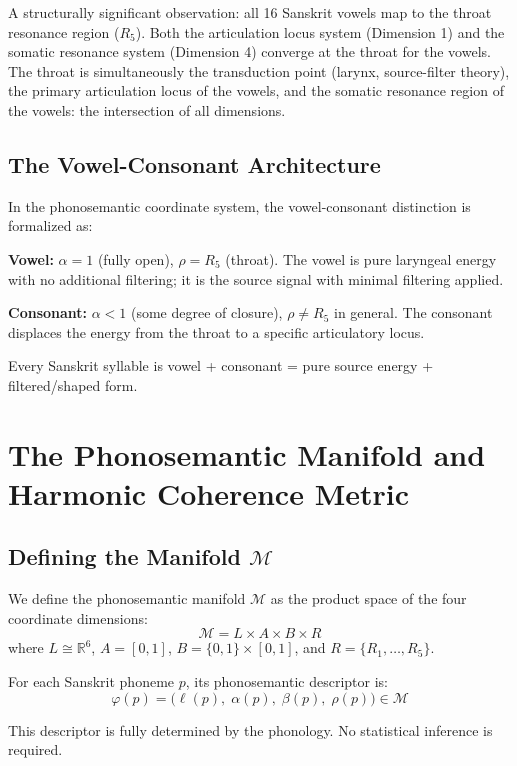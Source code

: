 \documentclass[12pt]{article}
\begin{document}
A structurally significant observation: all 16 Sanskrit vowels map to the throat resonance region ($R_5$). Both the articulation locus system (Dimension 1) and the somatic resonance system (Dimension 4) converge at the throat for the vowels. The throat is simultaneously the transduction point (larynx, source-filter theory), the primary articulation locus of the vowels, and the somatic resonance region of the vowels: the intersection of all dimensions.

\subsection{The Vowel-Consonant Architecture}

In the phonosemantic coordinate system, the vowel-consonant distinction is formalized as:

\textbf{Vowel:} $\alpha = 1$ (fully open), $\rho = R_5$ (throat). The vowel is pure laryngeal energy with no additional filtering; it is the source signal with minimal filtering applied.

\textbf{Consonant:} $\alpha < 1$ (some degree of closure), $\rho \neq R_5$ in general. The consonant displaces the energy from the throat to a specific articulatory locus.

Every Sanskrit syllable is vowel + consonant = pure source energy + filtered/shaped form.


\section{The Phonosemantic Manifold and Harmonic Coherence Metric}

\subsection{Defining the Manifold $\mathcal{M}$}

We define the phonosemantic manifold $\mathcal{M}$ as the product space of the four coordinate dimensions:
\[
\mathcal{M} = L \times A \times B \times R
\]
where $L \cong \mathbb{R}^6$, $A = [0,1]$, $B = \{0,1\} \times [0,1]$, and $R = \{R_1, \ldots, R_5\}$.

For each Sanskrit phoneme $p$, its phonosemantic descriptor is:
\[
\varphi(p) = \bigl(\ell(p),\; \alpha(p),\; \beta(p),\; \rho(p)\bigr) \in \mathcal{M}
\]

This descriptor is fully determined by the phonology. No statistical inference is required.
\end{document}
